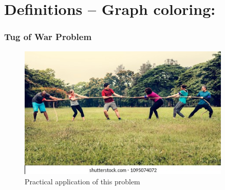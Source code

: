 \documentclass{beamer}
\begin{document}

\section{Definitions -- Graph coloring:}
\begin{frame}[fragile] 
	\frametitle{Tug of War Problem}
		
	
\begin{figure}[tbp]
  \centering
	 \includegraphics[width=0.9\textwidth , height=0.7\textheight] {fig01-tug-war.jpg}
  \caption{Practical application of this problem}
	
	\end{figure}

\end{frame}
\end{document}
